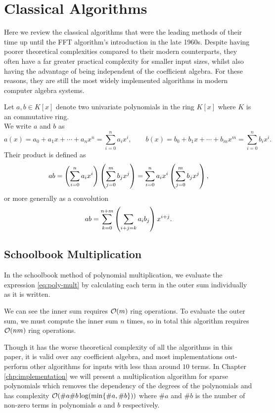 \chapter{Classical Algorithms}\label{chp:classical}


Here we review the classical algorithms that were the leading methods of their time up until the FFT algorithm's introduction in the late 1960s. Despite having poorer theoretical complexities compared to their modern counterparts, they often have a far greater practical complexity for smaller input sizes, whilst also having the advantage of being independent of the coefficient algebra. For these reasons, they are still the most widely implemented algorithms in modern computer algebra systems.

Let $a, b \in K[x]$ denote two univariate polynomials in the ring $K[x]$ where $K$ is an commutative ring.\\
We write $a$ and $b$ as
\[
    a(x) = a_0 + a_1x + \cdots + a_nx^n = \sum^n_{i=0} a_ix^i, \qquad b(x) = b_0 + b_1x + \cdots + b_mx^m = \sum^n_{i=0} b_ix^i.
\]
Their product is defined as
\begin{equation}\label{eq:poly-mult}
    ab = \left(\sum^n_{i=0} a_i x^i\right)\left(\sum^m_{j=0} b_j x^j\right) = \sum^n_{i=0} a_ix^i\left(\sum^m_{j=0} b_j x^j\right),
\end{equation}
or more generally as a convolution
\begin{equation}\label{eq:poly-mult-conv}
    ab = \sum^{n + m}_{k=0} \left(\sum_{i + j = k}a_ib_j\right) x^{i + j}.
\end{equation}

\section{Schoolbook Multiplication}
\label{sec:prelim-schoolbook}

In the schoolbook method of polynomial multiplication, we evaluate the expression \eqref{eq:poly-mult} by calculating each term in the outer sum individually as it is written.

We can see the inner sum requires $\mathcal O(m)$ ring operations. To evaluate the outer sum, we must compute the inner sum $n$ times, so in total this algorithm requires $\mathcal O(nm)$ ring operations.

Though it has the worse theoretical complexity of all the algorithms in this paper, it is valid over any coefficient algebra, and most implementations out-perform other algorithms for inputs with less than around $10$ terms. In Chapter \ref{chp:implementation} we will present a multiplication algorithm for sparse polynomials which removes the dependency of the degrees of the polynomials and has complexity $\mathcal O(\# a \# b \log(\min\{\# a, \# b\}))$ where $\# a$ and $\# b$ is the number of non-zero terms in polynomials $a$ and $b$ respectively.

